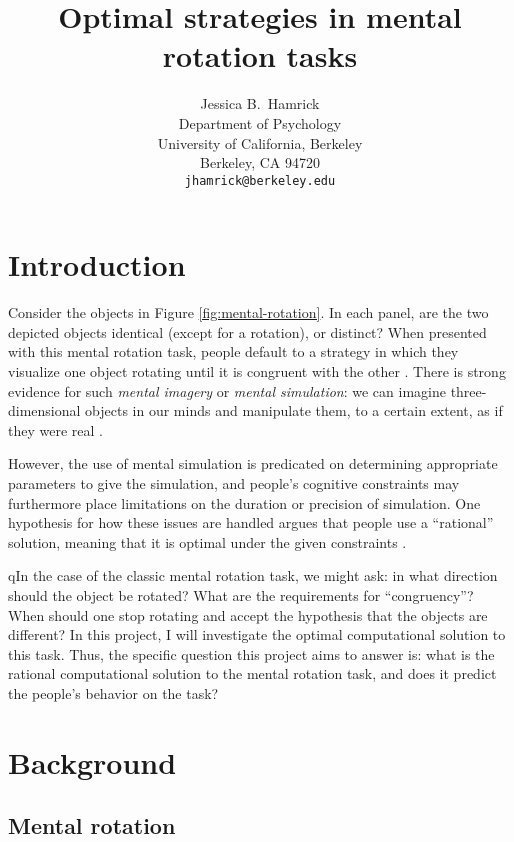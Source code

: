 \documentclass{article} %
\title{Optimal strategies in mental rotation tasks}
\author{Jessica B.~Hamrick\\
  Department of Psychology\\
  University of California, Berkeley\\
  Berkeley, CA 94720\\
  \texttt{jhamrick@berkeley.edu}}
\begin{document}
\maketitle

\section{Introduction}


Consider the objects in Figure \ref{fig:mental-rotation}. In each
panel, are the two depicted objects identical (except for a rotation),
or distinct? When presented with this mental rotation task, people
default to a strategy in which they visualize one object rotating
until it is congruent with the other \cite{Shepard1971}. There is
strong evidence for such \textit{mental imagery} or \textit{mental
  simulation}: we can imagine three-dimensional objects in our minds
and manipulate them, to a certain extent, as if they were real
\cite{Kosslyn:2009tj}.

However, the use of mental simulation is predicated on determining
appropriate parameters to give the simulation, and people's cognitive
constraints may furthermore place limitations on the duration or
precision of simulation. One hypothesis for how these issues are
handled argues that people use a ``rational'' solution, meaning that
it is optimal under the given constraints
\cite{Lieder:2012wg,Vul:2009wy,Griffiths2012a}.

qIn the case of the classic mental rotation task, we might ask: in what
direction should the object be rotated?  What are the requirements for
``congruency''? When should one stop rotating and accept the
hypothesis that the objects are different? In this project, I will
investigate the optimal computational solution to this task. Thus, the
specific question this project aims to answer is: what is the rational
computational solution to the mental rotation task, and does it
predict the people's behavior on the task?

\section{Background}

\subsection{Mental rotation}
\end{document}
